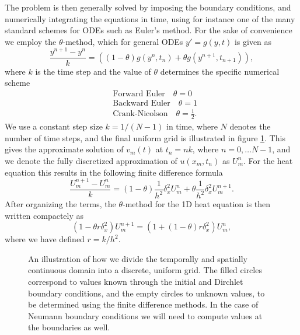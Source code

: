 The problem is then generally solved by imposing the boundary conditions, 
and numerically integrating the equations in time, 
using for instance one of the many standard schemes for ODEs such as Euler's method. 
For the sake of convenience we employ the $\theta$-method, 
which for general ODEs $y' = g(y, t)$ is given as
\begin{equation*}
    \frac{y^{n+1} - y^n}{k} = \left((1-\theta)g(y^n, t_n)+\theta g(y^{n+1}, t_{n+1})\right), 
\end{equation*}
where $k$ is the time step and the value of $\theta$ determines the specific numerical scheme 
\begin{align*}
    & \text{Forward Euler} \quad \theta = 0 \\
    & \text{Backward Euler} \quad \theta = 1 \\
    & \text{Crank-Nicolson} \quad \theta = \frac{1}{2}.
\end{align*}
We use a constant step size $k = 1/(N-1)$ in time, 
where $N$ denotes the number of time steps, 
and the final uniform grid is illustrated in figure \ref{fig:2-uniform-grid}. 
This gives the approximate solution of $v_m(t)$ at $t_n = nk$, 
where $n = 0, \ldots N-1$, 
and we denote the fully discretized approximation of $u(x_m, t_n)$ as $U_{m}^{n}$. 
For the heat equation  this results in the following finite difference formula
\begin{equation} 
    \frac{U_m^{n+1} - U_m^n}{k} = (1-\theta)\frac{1}{h^2}\delta_x^2 U_m^n + \theta\frac{1}{h^2}\delta_x^2 U_m^{n+1}. 
    \label{eq:theta-heat-raw}
\end{equation}
After organizing the terms, 
the $\theta$-method for the 1D heat equation is then written compactely as 
\begin{equation}
    (1 - \theta r \delta_x^2)U_m^{n+1} = \left(1 + (1-\theta)r\delta_x^2\right)U_m^n, 
    \label{eq:theta-heat}
\end{equation}
where we have defined $r=k/h^2$. 
\begin{figure}[ht!]
    \centering
    
    \caption{An illustration of how we divide the temporally and spatially continuous domain into a discrete, uniform grid. The filled circles correspond to values known through the initial and Dirchlet boundary conditions, and the empty circles to unknown values, to be determined using the finite difference methods. In the case of Neumann boundary conditions we will need to compute values at the boundaries as well.}
    \label{fig:2-uniform-grid}
\end{figure}

